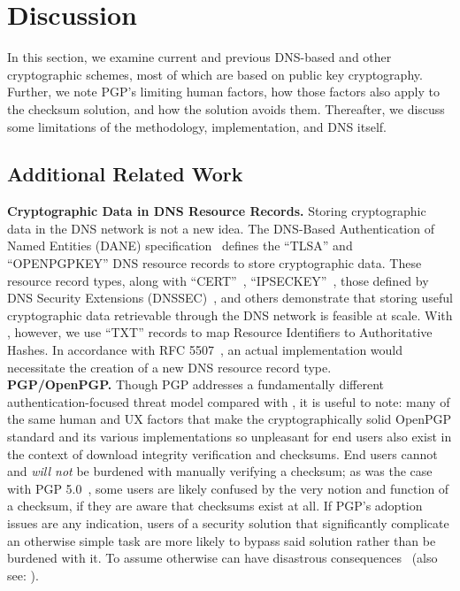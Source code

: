 \section{Discussion} \label{sec:discussion}

In this section, we examine current and previous DNS-based and other
cryptographic schemes, most of which are based on public key cryptography.
Further, we note PGP's limiting human factors, how those factors also apply to
the checksum solution, and how the \SYSTEM{} solution avoids them. Thereafter,
we discuss some limitations of the \SYSTEM{} methodology, implementation, and
DNS itself.

\subsection{Additional Related Work}

\noindent\textbf{Cryptographic Data in DNS Resource Records.} Storing
cryptographic data in the DNS network is not a new idea. The DNS-Based
Authentication of Named Entities (DANE) specification~\cite{DANE1, DANE2, DANE3}
defines the ``TLSA'' and ``OPENPGPKEY'' DNS resource records to store
cryptographic data. These resource record types, along with
``CERT''~\cite{CERT}, ``IPSECKEY''~\cite{IPSECKEY}, those defined by DNS
Security Extensions (DNSSEC)~\cite{DNSSEC}, and others demonstrate that storing
useful cryptographic data retrievable through the DNS network is feasible at
scale. With \SYSTEM{}, however, we use ``TXT'' records to map Resource
Identifiers to Authoritative Hashes. In accordance with RFC 5507~\cite{RFC5507},
an actual \SYSTEM{} implementation would necessitate the creation of a new DNS
resource record type. \\

\noindent\textbf{PGP/OpenPGP.} Though PGP addresses a fundamentally different
authentication-focused threat model compared with \SYSTEM{}, it is useful to
note: many of the same human and UX factors that make the cryptographically
solid OpenPGP standard and its various implementations so unpleasant for end
users also exist in the context of download integrity verification and
checksums. End users cannot and \textit{will not} be burdened with manually
verifying a checksum; as was the case with PGP 5.0~\cite{PGPBad}, some users are
likely confused by the very notion and function of a checksum, if they are aware
that checksums exist at all. If PGP's adoption issues are any indication, users
of a security solution that significantly complicate an otherwise simple task
are more likely to bypass said solution rather than be burdened with it. To
assume otherwise can have disastrous consequences~\cite{PGPBad} (also see:
). \\

